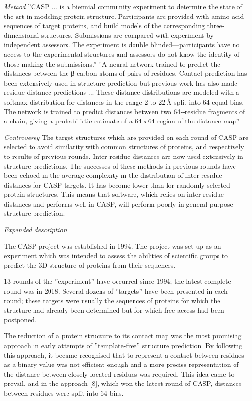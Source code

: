 \documentclass[12pt,aps]{revtex4}
\begin{document}
\emph{Method} ''CASP ... is a biennial community experiment to determine the state of the art in modeling protein structure. Participants are provided with amino acid sequences of target proteins, and build models of the corresponding three‐dimensional structures. Submissions are compared with experiment by independent assessors. The experiment is double blinded—participants have no access to the experimental structures and assessors do not know the identity of those making the submissions.'' ''A neural network  trained to predict the distances between the β‐carbon atoms of pairs of residues. Contact prediction has been extensively used in structure prediction but previous work has also made residue distance predictions ... These distance distributions are modeled with a softmax distribution for distances in the range 2 to 22 Å split into 64 equal bins. The network is trained to predict distances between two 64‐-residue fragments of a chain, giving a probabilistic estimate of a 64 x 64 region of the distance map''

\emph{Controversy} The target structures which are provided on each round of CASP are selected to avoid similarity with common structures of proteins, and respectively to results of previous rounds. Inter-residue distances are now used extensively in structure predictions. The successes of these methods in previous rounds have been echoed in the average complexity in the distribution of inter-residue distances for CASP targets. It has become lower than for randomly selected protein structures. This means that software, which relies on inter-residue distances and performs well in CASP, will perform poorly in general-purpose structure prediction.

\emph{Expanded description}

The CASP project was established in 1994. The project was set up as an experiment which was intended to assess the abilities of scientific groups to predict the 3D-structure of proteins from their sequences.

13 rounds of the ”experiment” have occurred since 1994; the latest complete round was in 2018. Several dozens of ”targets” have been presented in each round; these targets were usually the sequences of proteins for which the structure had already been determined but for which free access had been postponed.

The reduction of a protein structure to its contact map was the most promising approach in early attempts of ”template-free” structure prediction. By following this approach, it became recognised that to represent a contact between residues as a binary value was not efficient enough and a more precise representation of the distance between closely located residues was required. This idea came to prevail, and in the approach [8], which won the latest round of CASP, distances between residues were split into 64 bins.
\end{document}
